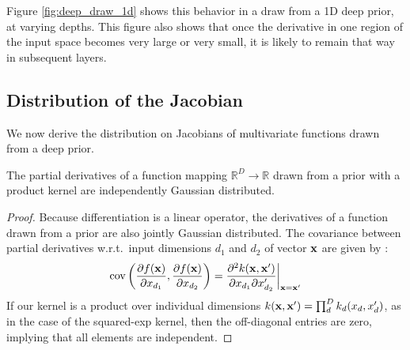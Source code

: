 \documentclass[twoside]{article}
\makeatletter
\newlength{\nonHumbleHeight}
\def\@humbleformat#1{{\settoheight{\nonHumbleHeight}{#1}\resizebox{!}{0.94\nonHumbleHeight}{#1}}}%
\newcommand\humble[1]{{\@humbleformat{#1}}}%
\newcommand{\gp}{{\humble{GP}}}
\newcommand{\lengthscale}{w}
\newcommand{\sectiondist}{}
\makeatother
\begin{document}
Figure \ref{fig:deep_draw_1d} shows this behavior in a draw from a 1D deep \gp{} prior, at varying depths.  This figure also shows that once the derivative in one region of the input space becomes very large or very small, it is likely to remain that way in subsequent layers.
%







\subsection{Distribution of the Jacobian}
\sectiondist
\label{sec:theorem}

We now derive the distribution on Jacobians of multivariate functions drawn from a deep \gp{} prior.

\begin{lemma}
\label{thm:deriv-ind}
The partial derivatives of a function mapping $\mathbb{R}^D \rightarrow \mathbb{R}$ drawn from a \gp{} prior with a product kernel are independently Gaussian distributed.
\end{lemma}
%
\vspace{-0.25in}
\begin{proof}
Because differentiation is a linear operator, the derivatives of a function drawn from a \gp{} prior are also jointly Gaussian distributed.  The covariance between partial derivatives w.r.t.\ input dimensions $d_1$ and $d_2$ of vector ${\bf{x}}$ are given by \citet{Solak03derivativeobservations}:
%
\begin{align}
\operatorname{cov} \left( \frac{\partial f({\bf{x}})}{\partial x_{d_1}}, \frac{\partial f({\bf{x}})}{\partial x_{d_2}} \right) 
= \frac{\partial^2 k({\bf{x}}, {\bf{x}}')}{\partial x_{d_1} \partial x_{d_2}'} \bigg|_{{\bf{x}}={\bf{x}}'}
\end{align}
%
If our kernel is a product over individual dimensions $k({\bf{x}}, {\bf{x}}') = \prod_d^D k_d(x_d, x_d')$, as in the case of the squared-exp kernel, then the off-diagonal entries are zero, implying that all elements are independent.
\end{proof}
\end{document}

